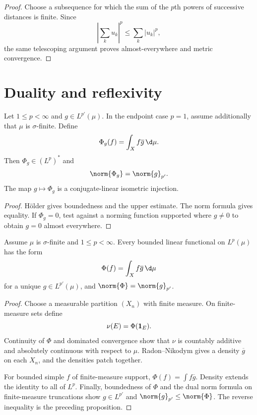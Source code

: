 \begin{proof}
Choose a subsequence for which the sum of the $p$th powers of successive distances is finite. Since
\[
\left|\sum_k u_k\right|^p\leq\sum_k|u_k|^p,
\]
the same telescoping argument proves almost-everywhere and metric convergence.
\end{proof}

\section{Duality and reflexivity}

\begin{prop}
Let $1\leq p<\infty$ and $g\in L^{p'}(\mu)$. In the endpoint case $p=1$, assume additionally that $\mu$ is $\sigma$-finite. Define
\[
\Phi_g(f)=\int_Xf\overline g\,\d\mu.
\]
Then $\Phi_g\in(L^p)^*$ and
\[
\norm{\Phi_g}=\norm{g}_{p'}.
\]
The map $g\mapsto\Phi_g$ is a conjugate-linear isometric injection.
\end{prop}

\begin{proof}
Hölder gives boundedness and the upper estimate. The norm formula gives equality. If $\Phi_g=0$, test against a norming function supported where $g\neq0$ to obtain $g=0$ almost everywhere.
\end{proof}

\begin{thm}
Assume $\mu$ is $\sigma$-finite and $1\leq p<\infty$. Every bounded linear functional on $L^p(\mu)$ has the form
\[
\Phi(f)=\int_Xf\overline g\,\d\mu
\]
for a unique $g\in L^{p'}(\mu)$, and $\norm{\Phi}=\norm{g}_{p'}$.
\end{thm}

\begin{proof}
Choose a measurable partition $(X_n)$ with finite measure. On finite-measure sets define
\[
\nu(E)=\Phi(\mathbf{1}_E).
\]
Continuity of $\Phi$ and dominated convergence show that $\nu$ is countably additive and absolutely continuous with respect to $\mu$. Radon--Nikodym gives a density $\overline g$ on each $X_n$, and the densities patch together.

For bounded simple $f$ of finite-measure support, $\Phi(f)=\int f\overline g$. Density extends the identity to all of $L^p$. Finally, boundedness of $\Phi$ and the dual norm formula on finite-measure truncations show $g\in L^{p'}$ and $\norm{g}_{p'}\leq\norm{\Phi}$. The reverse inequality is the preceding proposition.
\end{proof}

